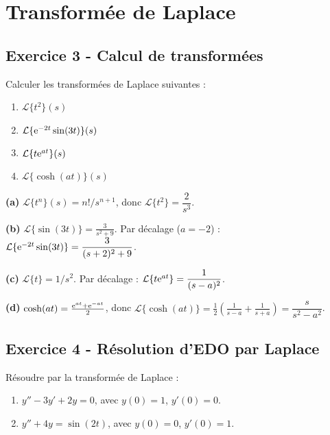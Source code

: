 \documentclass[12pt,a4paper]{article}
\begin{document}
\section{Transformée de Laplace}

\subsection*{Exercice 3 - Calcul de transformées \niveau{\facile}}

\begin{boiteexercice}
Calculer les transformées de Laplace suivantes :
\begin{enumerate}[label=(\alph*)]
  \item $\mathcal{L}\{t^2\}(s)$
  \item $\mathcal{L}\{\mathrm{e}^{-2t}\sin(3t)\}(s)$
  \item $\mathcal{L}\{t\mathrm{e}^{at}\}(s)$
  \item $\mathcal{L}\{\cosh(at)\}(s)$
\end{enumerate}
\end{boiteexercice}

\begin{boitecorrige}
\textbf{(a)} $\mathcal{L}\{t^n\}(s) = n!/s^{n+1}$, donc $\mathcal{L}\{t^2\} = \dfrac{2}{s^3}$.

\textbf{(b)} $\mathcal{L}\{\sin(3t)\} = \frac{3}{s^2+9}$. Par décalage ($a=-2$) : $\mathcal{L}\{\mathrm{e}^{-2t}\sin(3t)\} = \dfrac{3}{(s+2)^2+9}$.

\textbf{(c)} $\mathcal{L}\{t\} = 1/s^2$. Par décalage : $\mathcal{L}\{t\mathrm{e}^{at}\} = \dfrac{1}{(s-a)^2}$.

\textbf{(d)} $\cosh(at)=\frac{\mathrm{e}^{at}+\mathrm{e}^{-at}}{2}$, donc $\mathcal{L}\{\cosh(at)\} = \frac{1}{2}\left(\frac{1}{s-a}+\frac{1}{s+a}\right) = \dfrac{s}{s^2-a^2}$.
\end{boitecorrige}

\subsection*{Exercice 4 - Résolution d'EDO par Laplace \niveau{\moyen}}

\begin{boiteexercice}
Résoudre par la transformée de Laplace :
\begin{enumerate}[label=(\alph*)]
  \item $y''-3y'+2y=0$, avec $y(0)=1$, $y'(0)=0$.
  \item $y''+4y=\sin(2t)$, avec $y(0)=0$, $y'(0)=1$.
\end{enumerate}
\end{boiteexercice}
\end{document}
